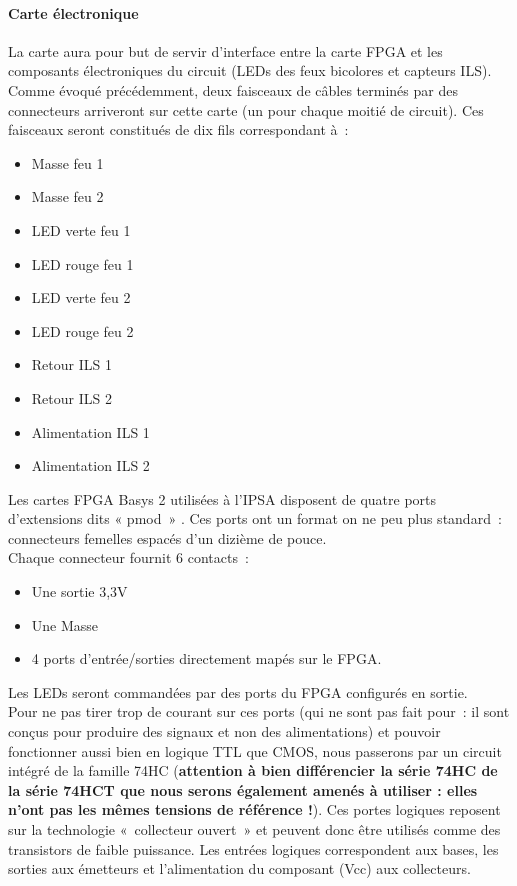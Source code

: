 		\paragraph{Carte électronique}

			La carte aura pour but de servir d’interface entre la carte FPGA et les composants électroniques du circuit (LEDs des feux bicolores et capteurs ILS).\\
			Comme évoqué précédemment, deux faisceaux de câbles terminés par des connecteurs arriveront sur cette carte (un pour chaque moitié de circuit). Ces faisceaux seront constitués de dix fils correspondant à :

			\begin{itemize}
				\item Masse feu 1
				\item Masse feu 2
				\item LED verte feu 1
				\item LED rouge feu 1
				\item LED verte feu 2
				\item LED rouge feu 2
				\item Retour ILS 1
				\item Retour ILS 2
				\item Alimentation ILS 1
				\item Alimentation ILS 2
			\end{itemize}

			Les cartes FPGA Basys 2 utilisées à l’IPSA disposent de quatre ports d’extensions dits « pmod » \cite{bib22}. Ces ports ont un format on ne peu plus standard : connecteurs femelles espacés d’un dizième de pouce.\\
			Chaque connecteur fournit 6 contacts :\\
			\begin{itemize}
				\item Une sortie 3,3V
				\item Une Masse
				\item 4 ports d’entrée/sorties directement mapés sur le FPGA.
			\end{itemize}


			Les LEDs seront commandées par des ports du FPGA configurés en sortie.\\
			Pour ne pas tirer trop de courant sur ces ports (qui ne sont pas fait pour : il sont conçus pour produire des signaux et non des alimentations) et pouvoir fonctionner aussi bien en logique TTL que CMOS, nous passerons par un circuit intégré de la famille 74HC (\textbf{attention à bien différencier la série 74HC de la série 74HCT que nous serons également amenés à utiliser : elles n'ont pas les mêmes tensions de référence !}). 
			Ces portes logiques reposent sur la technologie « collecteur ouvert » et peuvent donc être utilisés comme des transistors de faible puissance. Les entrées logiques correspondent aux bases, les sorties aux émetteurs et l’alimentation du composant (Vcc) aux collecteurs.\\

